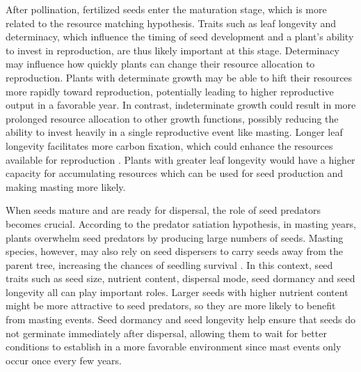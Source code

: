 \documentclass[11pt,letter]{article}
\begin{document}
After pollination, fertilized seeds enter the maturation stage, which is more related to the resource matching hypothesis. Traits such as leaf longevity and determinacy, which influence the timing of seed development and a plant's ability to invest in reproduction, are thus likely important at this stage. Determinacy \citep[whether the leaf material is prebuilt or not,][]{lechowicz1984temperate} may influence how quickly plants can change their resource allocation to reproduction. Plants with determinate growth may be able to hift their resources more rapidly toward reproduction, potentially leading to higher reproductive output in a favorable year. In contrast, indeterminate growth could result in more prolonged resource allocation to other growth functions, possibly reducing the ability to invest heavily in a single reproductive event like masting.  Longer leaf longevity facilitates more carbon fixation, which could enhance the resources available for reproduction \citep{adler2014functional}. Plants with greater leaf longevity would have a higher capacity for accumulating resources which can be used for seed production and making masting more likely.\par 

When seeds mature and are ready for dispersal, the role of seed predators becomes crucial. According to the predator satiation hypothesis, in masting years, plants overwhelm seed predators by producing large numbers of seeds. Masting species, however, may also rely on seed dispersers to carry seeds away from the parent tree, increasing the chances of seedling survival \citep{janzen1971seed, silvertown1980evolutionary}. In this context, seed traits such as seed size, nutrient content, dispersal mode, seed dormancy and seed longevity all can play important roles. Larger seeds with higher nutrient content might be more attractive to seed predators, so they are more likely to benefit from masting events. Seed dormancy and seed longevity help ensure that seeds do not germinate immediately after dispersal, allowing them to wait for better conditions to establish in a more favorable environment since mast events only occur once every few years.\par
\end{document}
